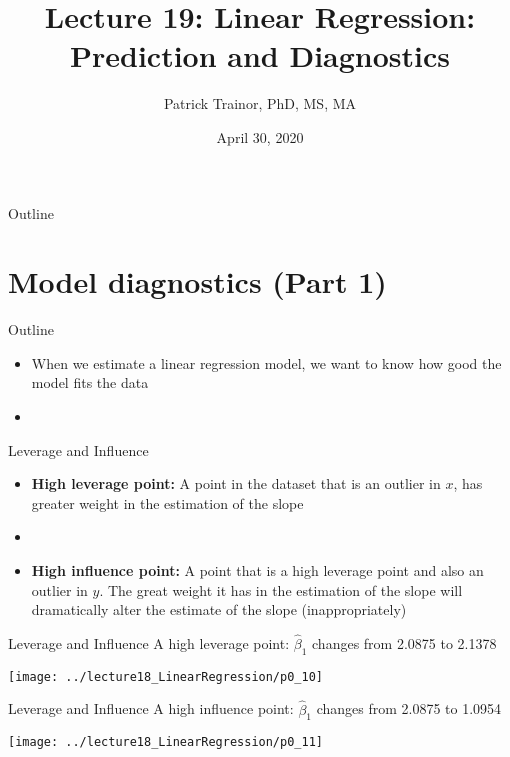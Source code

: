 \documentclass[xcolor=dvipsnames]{beamer}
\title[Lecture 19]{Lecture 19: Linear Regression: Prediction and Diagnostics}
\author[Patrick Trainor]{Patrick Trainor, PhD, MS, MA}
\institute[NMSU]{New Mexico State University}
\date{April 30, 2020}
\begin{document}
\begin{frame}
\maketitle
\end{frame}

\begin{frame}{Outline}
\tableofcontents[hideallsubsections]
\end{frame}

\section{Model diagnostics (Part 1)}
\begin{frame}{Outline}
\tableofcontents[currentsection,subsectionstyle=show/shaded/hide]
\end{frame}

\begin{frame}
	\begin{itemize}
		\item When we estimate a linear regression model, we want to know how good the model fits the data
		\item[]
	\end{itemize}
\end{frame}

\begin{frame}{Leverage and Influence}
	\begin{itemize}
		\item \textbf{High leverage point:} A point in the dataset that is an outlier in $x$, has greater weight in the estimation of the slope \pause
		\item[]
		\item \textbf{High influence point:} A point that is a high leverage point and also an outlier in $y$. The great weight it has in the estimation of the slope will dramatically alter the estimate of the slope (inappropriately)
	\end{itemize}
\end{frame}

\begin{frame}{Leverage and Influence}
A high leverage point: $\hat{\beta}_1$ changes from 2.0875 to 2.1378
	\begin{center}
		\texttt{[image: ../lecture18\_LinearRegression/p0\_10]}
	\end{center}
\end{frame}

\begin{frame}{Leverage and Influence}
A high influence point: $\hat{\beta}_1$ changes from 2.0875 to 1.0954
\begin{center}
	\texttt{[image: ../lecture18\_LinearRegression/p0\_11]}
\end{center}
\end{frame}
\end{document}
